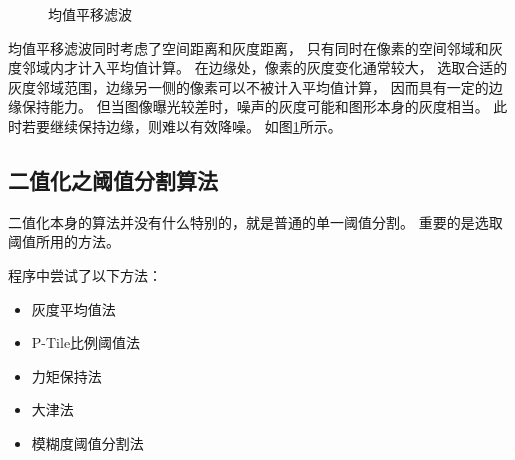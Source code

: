 \documentclass[12pt,a4paper]{report}
\begin{document}
\begin{figure}[!htb]
    \centering
    \hfill
    \caption{均值平移滤波}\label{fig:meanshift}
\end{figure}

均值平移滤波同时考虑了空间距离和灰度距离\cite{MeanShiftWiki}，
只有同时在像素的空间邻域和灰度邻域内才计入平均值计算。
在边缘处，像素的灰度变化通常较大，
选取合适的灰度邻域范围，边缘另一侧的像素可以不被计入平均值计算，
因而具有一定的边缘保持能力。
但当图像曝光较差时，噪声的灰度可能和图形本身的灰度相当。
此时若要继续保持边缘，则难以有效降噪。
如图\ref{fig:meanshift}所示。

\subsection{二值化之阈值分割算法}

二值化本身的算法并没有什么特别的，就是普通的单一阈值分割。
重要的是选取阈值所用的方法。

程序中尝试了以下方法：
\begin{itemize}
    \item 灰度平均值法
    \item P-Tile比例阈值法
    \item 力矩保持法\cite{Tsai1985Moment}
    \item 大津法\cite{Otsu1979A}
    \item 模糊度阈值分割法\cite{Huang1995Image}
\end{itemize}
\end{document}
